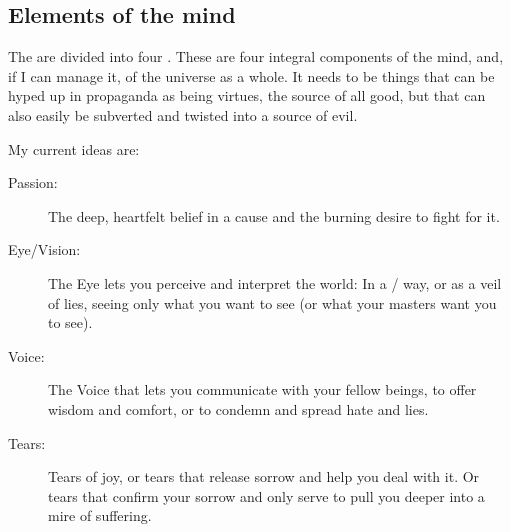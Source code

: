 









\subsection{Elements of the mind}
The \Sephiroth{} are divided into four . These are four integral components of the mind, and, if I can manage it, of the universe as a whole. It needs to be things that can be hyped up in propaganda as being virtues, the source of all good, but that can also easily be subverted and twisted into a source of evil. 

My current ideas are: 

\begin{description}
  \item[Passion:] 
    The deep, heartfelt belief in a cause and the burning desire to fight for it. 
  \item[Eye/Vision:] 
    The Eye lets you perceive and interpret the world: In a / way, or as a veil of lies, seeing only what you want to see (or what your masters want you to see).
  \item[Voice:] 
    The Voice that lets you communicate with your fellow beings, to offer wisdom and comfort, or to condemn and spread hate and lies. 
  \item[Tears:] 
    Tears of joy, or tears that release sorrow and help you deal with it. Or tears that confirm your sorrow and only serve to pull you deeper into a mire of suffering. 
\end{description}


